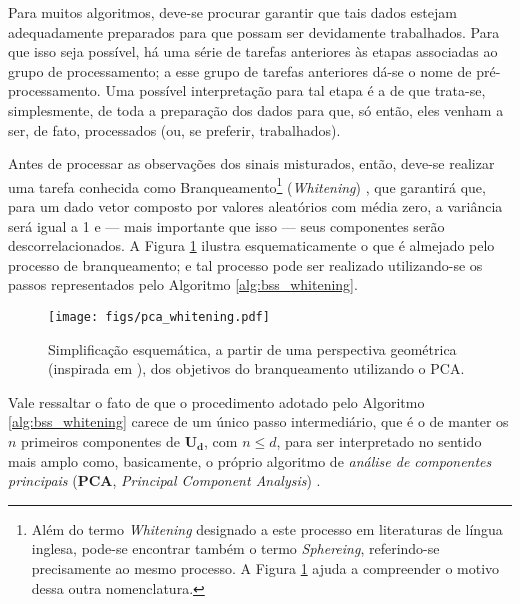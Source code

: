 
Para muitos algoritmos, deve-se procurar garantir que tais dados estejam adequadamente preparados para que possam ser devidamente trabalhados. Para que isso seja possível, há uma série de tarefas anteriores às etapas associadas ao grupo de processamento; a esse grupo de tarefas anteriores dá-se o nome de pré-processamento. Uma possível interpretação para tal etapa é a de que trata-se, simplesmente, de toda a preparação dos dados para que, só então, eles venham a ser, de fato, processados (ou, se preferir, trabalhados).

Antes de processar as observações dos sinais misturados, então, deve-se realizar uma tarefa conhecida como Branqueamento\footnote{Além do termo \textit{Whitening} designado a este processo em literaturas de língua inglesa, pode-se encontrar também o termo \textit{Sphereing}, referindo-se precisamente ao mesmo processo. A Figura \ref{fig:bss_pca_whitening} ajuda a compreender o motivo dessa outra nomenclatura.} (\textit{Whitening}) \citep{BELL19973327, koivunen1999feasibility}, que garantirá que, para um dado vetor composto por valores aleatórios com média zero, a variância será igual a 1 e --- mais importante que isso --- seus componentes serão descorrelacionados. A Figura \ref{fig:bss_pca_whitening} ilustra esquematicamente o que é almejado pelo processo de branqueamento; e tal processo pode ser realizado utilizando-se os passos representados pelo Algoritmo \ref{alg:bss_whitening}.

\begin{figure}[H]
    \centering
    \texttt{[image: figs/pca\_whitening.pdf]}
    \caption{Simplificação esquemática, a partir de uma perspectiva geométrica (inspirada em \citep{zafeiriou2015notes}), dos objetivos do branqueamento utilizando o PCA.}
    \label{fig:bss_pca_whitening}
\end{figure}

Vale ressaltar o fato de que o procedimento adotado pelo Algoritmo \ref{alg:bss_whitening} carece de um único passo intermediário, que é o de manter os $n$ primeiros componentes de $\mathbf{U_{d}}$, com $n\leq d$, para ser interpretado no sentido mais amplo como, basicamente, o próprio algoritmo de \textit{análise de componentes principais} (\textbf{PCA}, \textit{Principal Component Analysis}) \citep{doi:10.1080/14786440109462720}.

